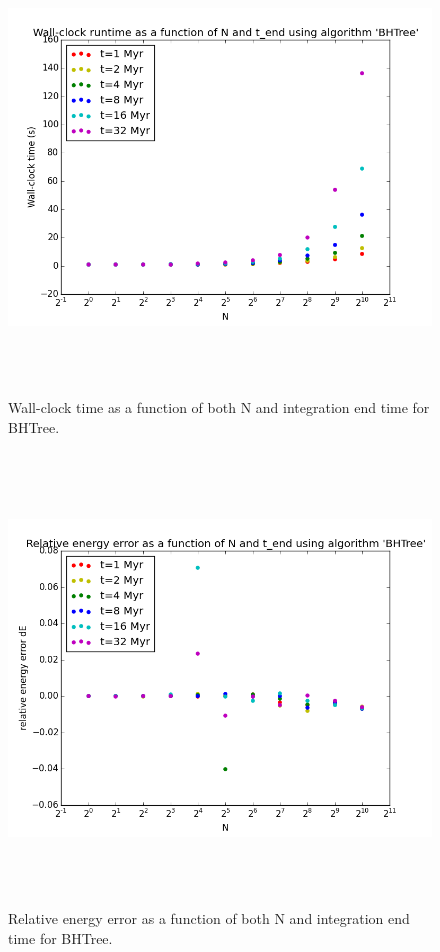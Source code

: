 \documentclass[a4paper]{article}
\begin{document}
\begin{figure}[h!]
\begin{center}
\includegraphics[height=12cm]{../GravitationalDynamics/plots/CA_GD_TLRH_s1603221_SS_s1617451_BHTree_runtime.png}
\caption{Wall-clock time as a function of both N and integration end time for BHTree.}
\label{fig:BHTree_runtime}
\end{center}
\end{figure}

\begin{figure}[h!]
\begin{center}
\includegraphics[height=12cm]{../GravitationalDynamics/plots/CA_GD_TLRH_s1603221_SS_s1617451_BHTree_dE.png}
\caption{Relative energy error as a function of both N and integration end time for BHTree.}
\label{fig:BHTree_dE}
\end{center}
\end{figure}
\end{document}
